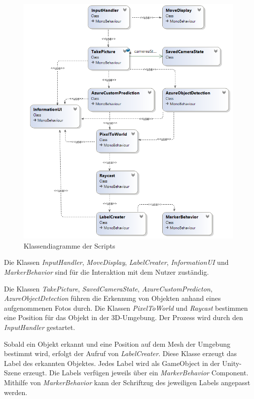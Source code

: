 \begin{figure}[H]
	\centering
	\includegraphics[width=1\textwidth]{images/klassendiagramm.png}
	\caption[Klassendiagramm der Skripts]{Klassendiagramme der Scripts}
	\label{dia:classdiagramm}
\end{figure}
 
Die Klassen \textit{InputHandler}, \textit{MoveDisplay}, \textit{LabelCreater}, \textit{InformationUI} und \textit{MarkerBehavior} sind für die Interaktion mit dem Nutzer zuständig. 

Die Klassen \textit{TakePicture}, \textit{SavedCameraState}, \textit{AzureCustomPredicton}, \textit{AzureObjectDetection} führen die Erkennung von Objekten anhand eines aufgenommenen Fotos durch. Die Klassen \textit{PixelToWorld} und \textit{Raycast} bestimmen eine Position für das Objekt in der 3D-Umgebung. Der Prozess wird durch den \textit{InputHandler} gestartet. 

Sobald ein Objekt erkannt und eine Position auf dem Mesh der Umgebung bestimmt wird, erfolgt der Aufruf von \textit{LabelCreater}. Diese Klasse erzeugt das Label des erkannten Objektes. Jedes Label wird als GameObject in der Unity-Szene erzeugt. Die Labels verfügen jeweils über ein  \textit{MarkerBehavior} Component. Mithilfe von \textit{MarkerBehavior} kann der Schriftzug des jeweiligen Labels angepasst werden.

